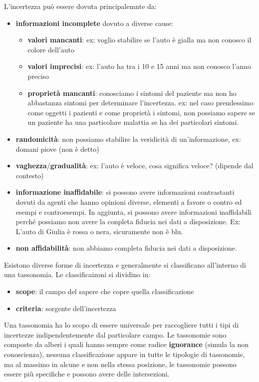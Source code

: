 L'incertezza può essere dovuta principalemnte da:
\begin{itemize}
    \item \textbf{informazioni incomplete} dovuto a diverse cause:
    \begin{itemize}
        \item \textbf{valori mancanti}: ex: voglio stabilire se l'auto è gialla ma
        non conosco il colore dell'auto
        \item \textbf{valori imprecisi}: ex: l'auto ha tra i 10 e 15 anni ma non 
        conosco l'anno preciso
        \item \textbf{proprietà mancanti}: conosciamo i sintomi del paziente ma non 
        ho abbastanza sintomi per determinare l'incertezza. ex: nel caso prendessimo come oggetti i
        pazienti e come proprietà i sintomi, non possiamo sapere se un paziente 
        ha una particolare malattia se ha dei particolari sintomi.
    \end{itemize}
    \item \textbf{randomicità}: non possiamo stabilire la 
    veridicità di un'informazione, ex: domani piove (non è detto)
    \item  \textbf{vaghezza}/\textbf{gradualità}: ex: l'auto è veloce, cosa significa veloce?
    (dipende dal contesto)
    \item \textbf{informazione inaffidabile}: si possono avere informazioni
    contrastanti dovuti da agenti che hanno opinioni diverse, elementi a favore
    o contro ed esempi e controesempi. In aggiunta, si possono avere informazioni
    inaffidabili perché possiamo non avere la conpleta fiducia nei dati a disposizione.
    Ex: L'auto di Giulia è rossa o nera, sicuramente non è blu.
    \item \textbf{non affidabilità}: non abbiamo completa fiducia nei dati a disposizione.
\end{itemize}

Esistono diverse forme di incertezza e generalmente si classificano all'interno
di una tassonomia. Le classificaizoni si dividino in:
\begin{itemize}
    \item \textbf{scope}: il campo del sapere che copre quella classificazione
    \item \textbf{criteria}: sorgente dell'incertezza
\end{itemize}

Una tassonomia ha lo scopo di essere universale per raccogliere tutti i tipi di
incertezze indipendentemente dal particolare campo. Le tassonomie sono composte
da alberi i quali hanno sempre come radice \textbf{ignorance} (simula la non conoscienza),
nessuna classificazione appare in tutte le tipologie di tassonomie, ma al massimo in alcune e non 
nella stessa posizione, le tassonomie possono essere più specifiche e possono avere delle intersezioni.

